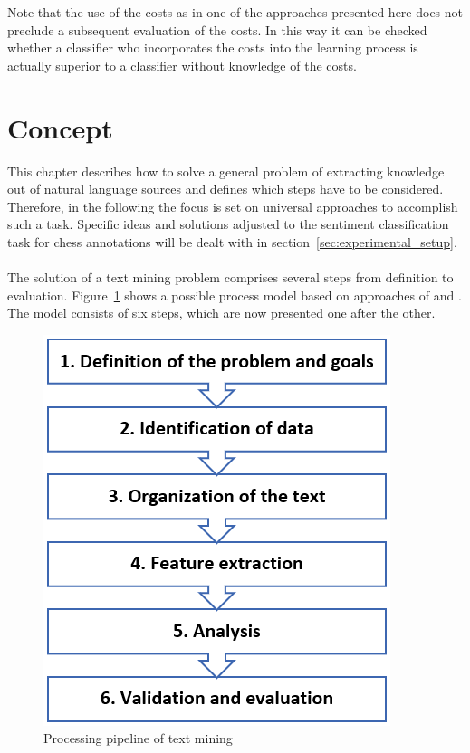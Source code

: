 \documentclass[article,type=msc,colorback,accentcolor=tud7b]{tudthesis}
\begin{document}
Note that the use of the costs as in one of the approaches presented here does not preclude a subsequent evaluation of the costs. In this way it can be checked whether a classifier who incorporates the costs into the learning process is actually superior to a classifier without knowledge of the costs.

  \clearpage
  
  \section{Concept}
  
    This chapter describes how to solve a general problem of extracting knowledge out of natural language sources and defines which steps have to be considered. Therefore, in the following the focus is set on universal approaches to accomplish such a task. Specific ideas and solutions adjusted to the sentiment classification task for chess annotations will be dealt with in section~\ref{sec:experimental_setup}. \\\\
    The solution of a text mining problem comprises several steps from definition to evaluation. Figure~\ref{fig:text_mining_pipeline} shows a possible process model based on approaches of \citeauthor{Schieber2014} \autocite{Schieber2014} and \citeauthor{Kwartler2017} \autocite{Kwartler2017}. The model consists of six steps, which are now presented one after the other.
    
    \begin{figure}[H]
      \centering
      \includegraphics{images/text_mining_pipeline}
      \caption{Processing pipeline of text mining}
      \label{fig:text_mining_pipeline}
    \end{figure}
  
\end{document}

